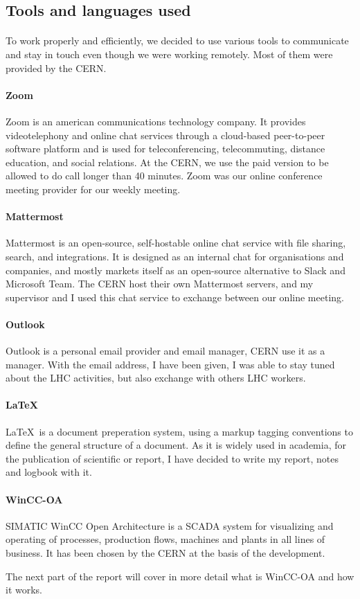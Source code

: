 \documentclass[../main.tex]{subfiles}
\begin{document}
\subsection{Tools and languages used}
\paragraph{}
To work properly and efficiently, we decided to use various tools to communicate and stay in touch even though we were working remotely. Most of them were provided by the CERN.
\paragraph{Zoom}
Zoom is an american communications technology company. It provides videotelephony and online chat services through a cloud-based peer-to-peer software platform and is used for teleconferencing, telecommuting, distance education, and social relations. At the CERN, we use the paid version to be allowed to do call longer than 40 minutes. Zoom was our online conference meeting provider for our weekly meeting.
\paragraph{Mattermost}
Mattermost is an open-source, self-hostable online chat service with file sharing, search, and integrations. It is designed as an internal chat for organisations and companies, and mostly markets itself as an open-source alternative to Slack and Microsoft Team. The CERN host their own Mattermost servers, and my supervisor and I used this chat service to exchange between our online meeting.
\paragraph{Outlook}
Outlook is a personal email provider and email manager, CERN use it as a manager. With the email address, I have been given, I was able to stay tuned about the LHC activities, but also exchange with others LHC workers. 
\paragraph{\LaTeX}
\LaTeX\ is a document preperation system, using a markup tagging conventions to define the general structure of a document. As it is widely used in academia, for the publication of scientific or report, I have decided to write my report, notes and logbook with it.
\paragraph{WinCC-OA}
SIMATIC WinCC Open Architecture is a SCADA system for visualizing and operating of processes, production flows, machines and plants in all lines of business. It has been chosen by the CERN at the basis of the development. 
\par \noindent \newline 
The next part of the report will cover in more detail what is WinCC-OA and how it works.
\end{document}
